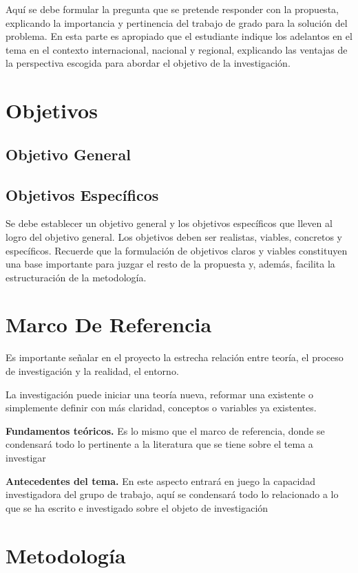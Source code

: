 \documentclass[12pt]{article}
\begin{document}
    Aquí se debe formular la pregunta que se pretende responder con la propuesta, explicando la importancia y pertinencia del trabajo de grado para la solución del problema.  En esta parte es apropiado que el estudiante indique los adelantos en el tema en el contexto internacional, nacional y regional, explicando las ventajas de la perspectiva escogida para abordar el objetivo de la investigación.


    \section{Objetivos}
    \subsection{Objetivo General}
    \subsection{Objetivos Específicos}

    Se debe establecer un objetivo general y los objetivos específicos que lleven al logro del objetivo general.  Los objetivos deben ser realistas, viables, concretos y específicos.  Recuerde que la formulación de objetivos claros y viables constituyen una base importante para juzgar el resto de la propuesta y, además, facilita la estructuración de la metodología.

    \section{Marco De Referencia}

    Es importante señalar en el proyecto la estrecha relación entre teoría, el proceso de investigación y la realidad, el entorno. 

    La investigación puede iniciar una teoría nueva, reformar una existente o simplemente definir con más claridad, conceptos o variables ya existentes.

    \textbf{Fundamentos teóricos.} Es lo mismo que el marco de referencia, donde se condensará todo lo pertinente a la literatura que se tiene sobre el tema a investigar
    
    \textbf{Antecedentes del tema.}  En este aspecto entrará en juego la capacidad investigadora del grupo de trabajo, aquí se condensará todo lo relacionado a lo que se ha escrito e investigado sobre el objeto de investigación

    \section{Metodología}
\end{document}
